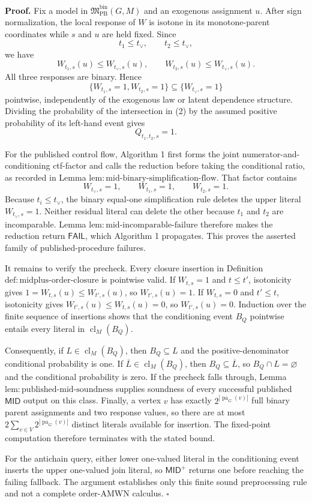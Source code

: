 \textbf{Proof.}
Fix a model in \(\mathfrak M_{\mathrm{PB}}^{\mathrm{bin}}(G,M)\) and an exogenous assignment \(u\).  After sign normalization, the local response of \(W\) is isotone in its monotone-parent coordinates while \(s\) and \(u\) are held fixed.  Since
\[
 t_1\le t_{\vee},
 \qquad
 t_2\le t_{\vee},
\]
we have
\[
 W_{t_1,s}(u)\le W_{t_{\vee},s}(u),
 \qquad
 W_{t_2,s}(u)\le W_{t_{\vee},s}(u).
\tag{1}
\]
All three responses are binary.  Hence
\[
 \{W_{t_1,s}=1,W_{t_2,s}=1\}
 \subseteq
 \{W_{t_{\vee},s}=1\}
\tag{2}
\]
pointwise, independently of the exogenous law or latent dependence structure.  Dividing the probability of the intersection in (2) by the assumed positive probability of its left-hand event gives
\[
 Q_{t_1,t_2,s}=1.
\tag{3}
\]

For the published control flow, Algorithm 1 first forms the joint numerator-and-conditioning ctf-factor and calls the reduction before taking the conditional ratio, as recorded in Lemma \(\mathrm{lem:mid\text{-}binary\text{-}simplification\text{-}flow}\).  That factor contains
\[
 W_{t_{\vee},s}=1,
 \qquad
 W_{t_1,s}=1,
 \qquad
 W_{t_2,s}=1.
\tag{4}
\]
Because \(t_i\le t_{\vee}\), the binary equal-one simplification rule deletes the upper literal \(W_{t_{\vee},s}=1\).  Neither residual literal can delete the other because \(t_1\) and \(t_2\) are incomparable.  Lemma \(\mathrm{lem:mid\text{-}incomparable\text{-}failure}\) therefore makes the reduction return \(\mathsf{FAIL}\), which Algorithm 1 propagates.  This proves the asserted family of published-procedure failures.

It remains to verify the precheck.  Every closure insertion in Definition \(\mathrm{def:midplus\text{-}order\text{-}closure}\) is pointwise valid.  If \(W_{t,s}=1\) and \(t\le t'\), isotonicity gives \(1=W_{t,s}(u)\le W_{t',s}(u)\), so \(W_{t',s}(u)=1\).  If \(W_{t,s}=0\) and \(t'\le t\), isotonicity gives \(W_{t',s}(u)\le W_{t,s}(u)=0\), so \(W_{t',s}(u)=0\).  Induction over the finite sequence of insertions shows that the conditioning event \(B_Q\) pointwise entails every literal in \(\operatorname{cl}_M(B_Q)\).

Consequently, if \(L\in\operatorname{cl}_M(B_Q)\), then \(B_Q\subseteq L\) and the positive-denominator conditional probability is one.  If \(\overline L\in\operatorname{cl}_M(B_Q)\), then \(B_Q\subseteq\overline L\), so \(B_Q\cap L=\varnothing\) and the conditional probability is zero.  If the precheck falls through, Lemma \(\mathrm{lem:published\text{-}mid\text{-}soundness}\) supplies soundness of every successful published \(\mathsf{MID}\) output on this class.  Finally, a vertex \(v\) has exactly \(2^{|\operatorname{pa}_G(v)|}\) full binary parent assignments and two response values, so there are at most \(2\sum_{v\in V}2^{|\operatorname{pa}_G(v)|}\) distinct literals available for insertion.  The fixed-point computation therefore terminates with the stated bound.

For the antichain query, either lower one-valued literal in the conditioning event inserts the upper one-valued join literal, so \(\mathsf{MID}^{+}\) returns one before reaching the failing fallback.  The argument establishes only this finite sound preprocessing rule and not a complete order-AMWN calculus. \(\square\)